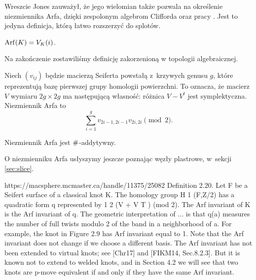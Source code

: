 Wreszcie Jones zauważył, że jego wielomian także pozwala na określenie niezmiennika Arfa, dzięki zespolonym algebrom Clifforda oraz pracy \cite{lannes85}.
Jest to jedyna definicja, którą łatwo rozszerzyć do splotów.

\begin{proposition}[Jones, 1985]
    $\operatorname{Arf}(K) = V_K(i)$.
\end{proposition}

Na zakończenie zostawiliśmy definicję zakorzenioną w topologii algebraicznej.

\begin{proposition}
    Niech $(v_{ij})$ będzie macierzą Seiferta powstałą z~krzywych genusu $g$, które reprezentują bazę pierwszej grupy homologii powierzchni.
    To oznacza, że macierz $V$ wymiaru $2g \times 2g$ ma następującą własność: różnica $V - V^t$ jest symplektyczna.
    Niezmiennik Arfa to
    \begin{equation}
        \sum^g_{i=1}v_{2i-1,2i-1}v_{2i,2i} \pmod 2.
    \end{equation}
\end{proposition}

\begin{proposition}
    Niezmiennik Arfa jest $\mathbin{\#}$-addytywny.
\end{proposition}

O niezmienniku Arfa usłyszymy jeszcze poznając węzły plastrowe, w~sekcji \ref{sec:slice}.

\begin{tobedone}
https://macsphere.mcmaster.ca/handle/11375/25082 Definition 2.20. Let F be a Seifert surface of a classical knot K. The homology group H 1 (F,Z/2) has a quadratic form q represented by 1 2 (V + V T ) (mod 2). The Arf invariant of K is the Arf invariant of q. The geometric interpretation of ...
is that q(a) measures the number of full twists modulo 2 of the band in a neighborhood of a. For example, the knot in Figure 2.9 has Arf invariant equal to 1. Note that the Arf invariant does not change if we choose a different basis. The Arf invariant has not been extended to virtual knots; see [Chr17] and [FIKM14, Sec.8.2.3]. But it is known not to extend to welded knots, and in Section 4.2 we will see that two knots are p-move equivalent if and only if they have the same Arf invariant.
\end{tobedone}


